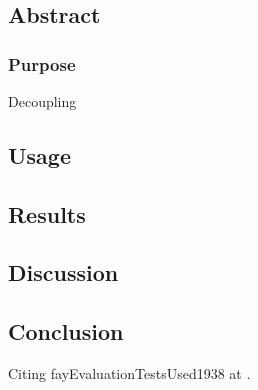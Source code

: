 
\chapter[CDD]{}\label{chap:01}


\setcounter{section}{-1}
\section{Abstract}

\subsection{Purpose}
Decoupling 


\section{Usage}

\section{Results}

\section{Discussion}

\section{Conclusion}
Citing fayEvaluationTestsUsed1938 at \cite{fayEvaluationTestsUsed1938}.





\printglossary[type=cdd]
